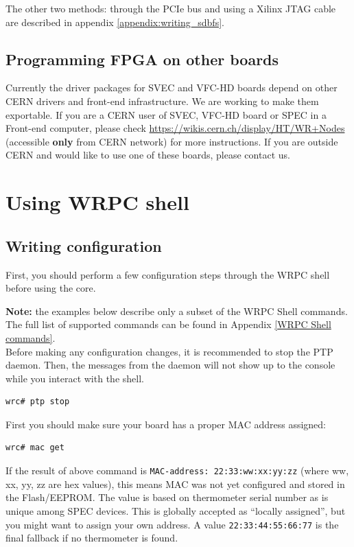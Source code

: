 \documentclass[a4paper, 12pt]{article}
\renewcommand{\_}{\underscore\allowbreak}
\begin{document}
The other two methods: through the PCIe bus and using a Xilinx JTAG cable are
described in appendix \ref{appendix:writing_sdbfs}.


\subsection{Programming FPGA on other boards}

Currently the driver packages for SVEC and VFC-HD boards depend on other CERN
drivers and front-end infrastructure. We are working to make them exportable. If
you are a CERN user of SVEC, VFC-HD board or SPEC in a Front-end computer,
please check
\url{https://wikis.cern.ch/display/HT/WR+Nodes} (accessible \textbf{only} from
CERN network) for more instructions. If you are outside CERN and would like to
use one of these boards, please contact us.

\newpage
\section{Using WRPC shell}

\subsection{Writing configuration}
\label{Writing configuration}

First, you should perform a few configuration steps through the WRPC shell
before using the core.

\noindent\textbf{Note:} the examples below describe only a subset of the WRPC
Shell commands. The full list of supported commands can be found in Appendix
\ref{WRPC Shell commands}.\\

Before making any configuration changes, it is recommended to stop the
PTP daemon.  Then, the messages from the daemon will not show up to the
console while you interact with the shell.

\begin{lstlisting}
wrc# ptp stop
\end{lstlisting}

\noindent First you should make sure your board has a proper MAC address
assigned:
\begin{lstlisting}
wrc# mac get
\end{lstlisting}
If the result of above command is \texttt{MAC-address: 22:33:ww:xx:yy:zz} (where
ww, xx, yy, zz are hex values), this
means MAC was not yet configured and stored in the Flash/EEPROM. The value is
based on thermometer serial number as is unique among SPEC devices. This is
globally accepted as ``locally assigned'', but you might want to assign your own
address. A value \texttt{22:33:44:55:66:77} is the final fallback if no
thermometer is found.
\end{document}
